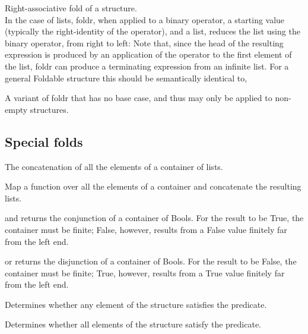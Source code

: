Right-associative fold of a structure.\\
In the case of lists, foldr, when applied to a binary operator, a starting value (typically the right-identity of the operator), and a list, reduces the list using the binary operator, from right to left:
Note that, since the head of the resulting expression is produced by an application of the operator to the first element of the list, foldr can produce a terminating expression from an infinite list.
For a general Foldable structure this should be semantically identical to,

A variant of foldr that has no base case, and thus may only be applied to non-empty structures.

\newpage
\subsection{Special folds}
The concatenation of all the elements of a container of lists.

Map a function over all the elements of a container and concatenate the resulting lists.

and returns the conjunction of a container of Bools. For the result to be True, the container must be finite; False, however, results from a False value finitely far from the left end.

or returns the disjunction of a container of Bools. For the result to be False, the container must be finite; True, however, results from a True value finitely far from the left end.

Determines whether any element of the structure satisfies the predicate.

Determines whether all elements of the structure satisfy the predicate.

